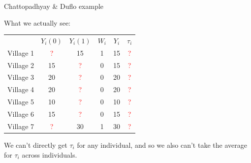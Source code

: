 \documentclass[xcolor={dvipsnames},handout]{beamer}
\begin{document}

\begin{frame}{Chattopadhyay \& Duflo example}

What we actually see:

\begin{table}[]
\begin{tabular}{lccccc}
& $Y_i(0)$ & $Y_i(1)$ & $W_i$ & $Y_i$ & $\tau_i$ \\
Village 1 & \textcolor{red}{?} & 15 & 1 & 15 & \textcolor{red}{?} \\
Village 2 & 15 & \textcolor{red}{?} & 0 & 15 & \textcolor{red}{?} \\
Village 3 & 20 & \textcolor{red}{?} & 0 & 20 & \textcolor{red}{?} \\
Village 4 & 20 & \textcolor{red}{?} & 0 & 20 & \textcolor{red}{?} \\
Village 5 & 10 & \textcolor{red}{?} & 0 & 10 & \textcolor{red}{?} \\
Village 6 & 15 & \textcolor{red}{?} & 0 & 15 & \textcolor{red}{?} \\
Village 7 & \textcolor{red}{?} & 30 & 1 & 30 & \textcolor{red}{?}
\end{tabular}
\end{table}

We can't directly get $\tau_i$ for any individual, and so we also can't take the average for $\tau_i$ across individuals.


\end{frame}



\end{document}

